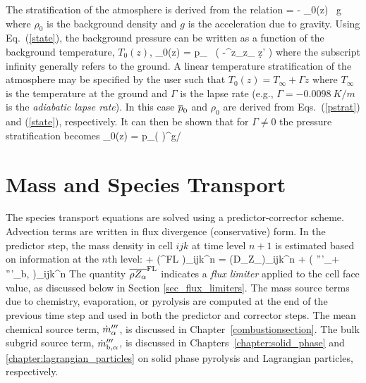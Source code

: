 The stratification of the atmosphere is derived from the relation
\be {} = - \rho_0(z) \, g  \ee
where $\rho_0$ is the background density and $g$ is the acceleration due to gravity. Using Eq.~(\ref{state}), the background pressure can be written as a function of the background temperature, $T_0(z)$,
\be \bp_0(z) = p_\infty \; \exp \, \left( -\int^z_{z_\infty}  \d z' \right)  \label{pstrat} \ee
where the subscript infinity generally refers to the ground. A linear temperature stratification of the atmosphere may be
specified by the user such that $T_0(z) = T_\infty + \Gamma z$ where $T_\infty$ is the temperature at the ground and
$\Gamma$ is the lapse rate (e.g., $\Gamma = -\SI{0.0098}{K/m}$ is the {\em adiabatic lapse rate}).
In this case $\overline{p}_0$ and $\rho_0$ are derived from Eqs.~(\ref{pstrat}) and (\ref{state}), respectively.
It can then be shown that for $\Gamma \ne 0$ the pressure stratification becomes
\be
   \bp_0(z) = p_\infty  \left(  \right)^{g/\R \Gamma}
   \label{pstrat2}
\ee


\section{Mass and Species Transport}

The species transport equations are solved using a predictor-corrector scheme. Advection terms are written in flux divergence (conservative) form. In the predictor step, the mass density in cell $ijk$ at time level $n+1$ is estimated based on information at the $n$th level:
\be  {}
  + \nabla\!\cdot(^{\rm FL} )_{ijk}^n
  = \nabla\!\cdot (\rho D_\alpha \nabla Z_\alpha)_{ijk}^n + \left( '''_\alpha + '''_{\rm b,\alpha} \right)_{ijk}^n
\ee
The quantity $\overline{\rho Z_\alpha}^{\rm FL}$ indicates a \emph{flux limiter} applied to the cell face value, as discussed below in Section \ref{sec_flux_limiters}. The mass source terms due to chemistry, evaporation, or pyrolysis are computed at the end of the previous time step and used in both the predictor and corrector steps. The mean chemical source term, $\dot{m}_{\alpha}'''$, is discussed in Chapter~\ref{combustionsection}.  The bulk subgrid source term, $\dot{m}_{\rm b,\alpha}'''$, is discussed in Chapters~\ref{chapter:solid_phase} and \ref{chapter:lagrangian_particles} on solid phase pyrolysis and Lagrangian particles, respectively.

